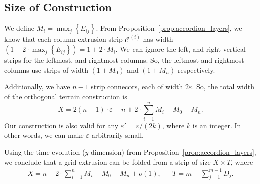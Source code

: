 \subsection{Size of Construction}
\label{sec:size}

We define $M_i = \max_j\left\{ E_{ij}\right\}$.
From Proposition~\ref{prop:accordion_layers}, we know that each column extrusion strip
$\mathcal C^{(i)}$ has width $\left( 1 + 2\cdot\max_j\left\{ E_{ij}\right\}\right) = 1+2\cdot M_i$.
We can ignore the left, and right vertical strips for the leftmost, and rightmost columns.
So, the leftmost and rightmost columns use strips of width $(1 + M_0)$ and $(1 + M_n)$ respectively.

Additionally, we have $n-1$ strip connecors, each of width $2\varepsilon$.
So, the total width of the orthogonal terrain construction is
$$X = 2(n-1)\cdot\varepsilon + n + 2\cdot\sum\limits_{i=1}^n M_i - M_0 - M_n.$$
Our construction is also valid for any $\varepsilon' = \varepsilon/(2k)$, where $k$ is an integer.
In other words, we can make $\varepsilon$ arbitrarily small.

\begin{theorem}
\label{thm:grid_extrusion}
Using the time evolution ($y$ dimension) from Proposition~\ref{prop:accordion_layers},
we conclude that a grid extrusion can be folded from a strip of size $X\times T$, where
\begin{align*}
X = n + 2\cdot\sum\limits_{i=1}^n M_i - M_0 - M_n + o(1), && T = m + \sum\limits^{m-1}_{j=1} D_j.
\end{align*}
\end{theorem}

